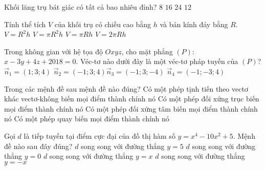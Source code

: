 \begin{ex}%
	Khối lăng trụ bát giác có tất cả bao nhiêu đỉnh?
	\choice
	{$8$}
	{\True $16$}
	{$24$}
	{$12$}
\end{ex}

\begin{ex}%
	Tính thể tích $V$ của khối trụ có chiều cao bằng $h$ và bán kính đáy bằng $R$. 
	\choice
	{$V=R^2 h$}
	{\True $V=\pi R^2 h$}
	{$V=\pi R h$}
	{$V=2\pi R h$}
	
\end{ex}

\begin{ex}%
	Trong không gian với hệ tọa độ $Oxyz$, cho mặt phẳng $(P)$: $x-3y+4z+2018=0$. Véc-tơ nào dưới đây là một véc-tơ pháp tuyến của $(P)$?
	\choice
	{$\vec{n}_1=(1;3;4)$}
	{$\vec{n}_2=(-1;3;4)$}{\True $\vec{n}_3=(-1;3;-4)$}
	{$\vec{n}_4=(-1;-3;4)$}
\end{ex}

\begin{ex}%
	Trong các mệnh đề sau mệnh đề nào đúng?
	\choice
	{Có một phép tịnh tiến theo vectơ khác vectơ-không biến mọi điểm thành chính nó}
	{Có một phép đối xứng trục biến mọi điểm thành chính nó}
	{Có một phép đối xứng tâm biến mọi điểm thành chính nó}
	{\True Có một phép quay biến mọi điểm thành chính nó}
\end{ex}

\begin{ex}%
	Gọi $d$ là tiếp tuyến tại điểm cực đại của đồ thị hàm số $y=x^4-10x^2+5$. Mệnh đề nào sau đây đúng?
	\choice
	{$d$ song song với đường thẳng $y=5$}
	{\True $d$ song song với đường thẳng $y=0$}
	{$d$ song song với đường thẳng $y=x$}
	{$d$ song song với đường thẳng $y=-x$}
	
\end{ex}

